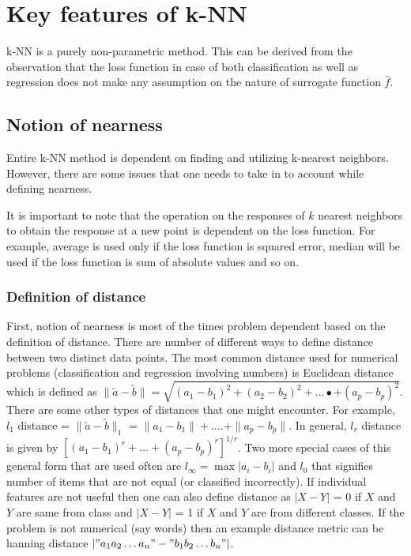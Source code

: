 \documentclass{article}
\begin{document}
\section{Key features of k-NN}
k-NN is a purely non-parametric method. This can be derived from the observation that the loss function in case of both classification as well as regression does not make any assumption on the nature of surrogate function $\hat{f}$.

\subsection{Notion of nearness}
Entire k-NN method is dependent on finding and utilizing k-nearest neighbors. However, there are some issues that one needs to take in to account while defining nearness. 

It is important to note that the operation on the responses of $k$ nearest neighbors to obtain the response at a new point is dependent on the loss function. For example, average is used only if the loss function is squared error, median will be used if the loss function is sum of absolute values and so on.

\subsubsection{Definition of distance}
First, notion of nearness is most of the times problem dependent based on the definition of distance. There are number of different ways to define distance between two distinct data points. The most common distance used for numerical problems (classification and regression involving numbers) is Euclidean distance which is defined as $\| \utilde{a} - \utilde{b}\| = \sqrt{(a_1 - b_1)^2 + (a_2 - b_2)^2 +\dots{•}+ (a_p - b_p)^2}$. There are some other types of distances that one might encounter. For example, $l_1$ distance = $\| \utilde{a} - \utilde{b} \|_1$ = $\|a_1 - b_1\| + \dots{.} + \|a_p - b_p\|$. In general, $l_r$ distance is given by $[(a_1 - b_1)^r + \dots{} + (a_p - b_p)^r]^{1/r}$. Two more special cases of this general form that are used often are $l_{\infty} = \max{|a_i - b_i|}$ and $l_0$ that signifies number of items that are not equal (or classified incorrectly). If individual features are not useful then one can also define distance as $|X - Y|$ = 0 if $X$ and $Y$ are same from class and $|X - Y|$ = 1 if $X$ and $Y$ are from different classes. If the problem is not numerical (say words) then an example distance metric can be hanning distance $|"a_1a_2\dots{}a_n" - "b_1b_2\dots{}b_n"|$.
\end{document}
